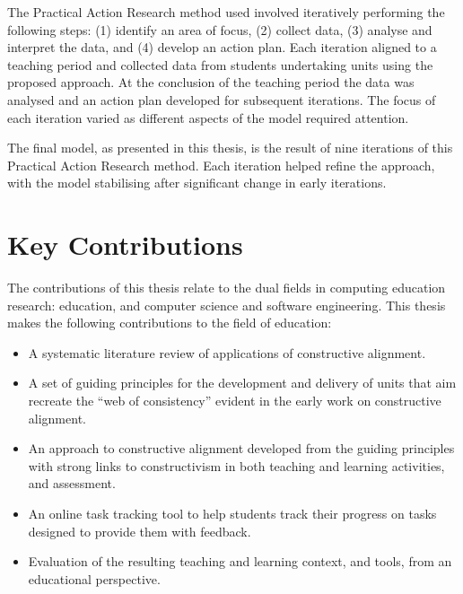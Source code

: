 The Practical Action Research method used involved iteratively performing the following steps: (1) identify an area of focus, (2) collect data, (3) analyse and interpret the data, and (4) develop an action plan. Each iteration aligned to a teaching period and collected data from students undertaking units using the proposed approach. At the conclusion of the teaching period the data was analysed and an action plan developed for subsequent iterations. The focus of each iteration varied as different aspects of the model required attention.

The final model, as presented in this thesis, is the result of nine iterations of this Practical Action Research method. Each iteration helped refine the approach, with the model stabilising after significant change in early iterations. 


\section{Key Contributions} %
\label{sec:key_contributions}

The contributions of this thesis relate to the dual fields in computing education research: education, and computer science and software engineering. This thesis makes the following contributions to the field of education:
\begin{itemize}[noitemsep,nolistsep]
	\item A systematic literature review of applications of constructive alignment.
	\item A set of guiding principles for the development and delivery of units that aim recreate the ``web of consistency'' evident in the early work on constructive alignment. 
	\item An approach to constructive alignment developed from the guiding principles with strong links to constructivism in both teaching and learning activities, and assessment.
	\item An online task tracking tool to help students track their progress on tasks designed to provide them with feedback.
	\item Evaluation of the resulting teaching and learning context, and tools, from an educational perspective.
\end{itemize}

